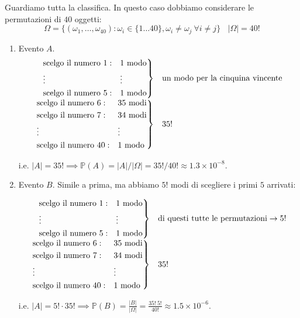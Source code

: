 Guardiamo tutta la classifica. In questo caso dobbiamo considerare le permutazioni di $40$ oggetti:
\begin{equation*}
\Omega =\{( \omega _{1} ,\dotsc ,\omega _{40}) :\omega _{i} \in \{1\dotsc 40\} ,\omega _{i} \neq \omega _{j} \ \forall i\neq j\} \ \ \ \ | \Omega | =40!
\end{equation*}
\begin{enumerate}
\item Evento $A$.\begin{equation*}
\begin{array}{ r l }
\begin{drcases}
\text{scelgo il numero} \ 1: & 1\ \text{modo}\\
\vdots  & \vdots \\
\text{scelgo il numero} \ 5: & 1\ \text{modo}
\end{drcases} & \text{un modo per la cinquina vincente}\\
\begin{drcases}
\text{scelgo il numero} \ 6: & 35\ \text{modi}\\
\text{scelgo il numero} \ 7: & 34\ \text{modi}\\
\vdots  & \vdots \\
\text{scelgo il numero} \ 40: & 1\ \text{modo}
\end{drcases} & 35!
\end{array}
\end{equation*}

i.e. $| A| =35!\mathbb{\implies P}( A) =| A| /| \Omega | =35!/40!\approx 1.3\times 10^{-8}$.
\item Evento $B$. Simile a prima, ma abbiamo $5!$ modi di scegliere i primi $5$ arrivati:

\begin{equation*}
\begin{array}{ r l }
\begin{drcases}
\text{scelgo il numero} \ 1: & 1\ \text{modo}\\
\vdots  & \vdots \\
\text{scelgo il numero} \ 5: & 1\ \text{modo}
\end{drcases} & \text{di questi tutte le permutazioni}\rightarrow 5!\\
\begin{drcases}
\text{scelgo il numero} \ 6: & 35\ \text{modi}\\
\text{scelgo il numero} \ 7: & 34\ \text{modi}\\
\vdots  & \vdots \\
\text{scelgo il numero} \ 40: & 1\ \text{modo}
\end{drcases} & 35!
\end{array}
\end{equation*}

i.e. $| A| =5!\cdot 35!\mathbb{\implies P}( B) =\frac{| B| }{| \Omega | } =\frac{35!\ 5!}{40!} \approx 1.5\times 10^{-6}$.
\end{enumerate}

